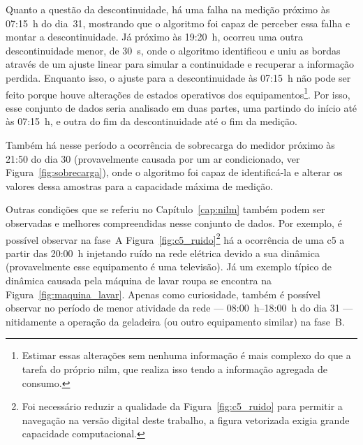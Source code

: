 Quanto a questão da descontinuidade, há uma falha na medição próximo
às 07:15~h do dia~31, mostrando que o algoritmo foi capaz de perceber
essa falha e montar a descontinuidade. Já próximo às 19:20~h, ocorreu
uma outra descontinuidade menor, de 30~s, onde o algoritmo identificou
e uniu as bordas através de um ajuste linear para simular a
continuidade e recuperar a informação perdida. Enquanto isso, o ajuste para a
descontinuidade às 07:15~h não pode ser feito porque houve alterações
de estados operativos dos equipamentos\footnote{Estimar essas
alterações sem nenhuma informação é mais complexo do que a tarefa do
próprio \acs{nilm}, que realiza isso tendo a informação agregada de
consumo.}. Por isso, esse conjunto de dados seria analisado em duas
partes, uma partindo do início até às 07:15~h, e outra do fim da
descontinuidade até o fim da medição.

Também há nesse período a ocorrência de sobrecarga do medidor próximo
às 21:50 do dia 30 (provavelmente causada por um ar condicionado, ver
Figura~\ref{fig:sobrecarga}), onde o algoritmo foi capaz de
identificá-la e alterar os valores dessa amostras para a capacidade
máxima de medição.

Outras condições que se referiu no Capítulo~\ref{cap:nilm} também
podem ser observadas e melhores compreendidas nesse conjunto de dados.
Por exemplo, é possível observar na fase~A
Figura~\ref{fig:c5_ruido}\footnote{Foi necessário reduzir a qualidade
da Figura~\ref{fig:c5_ruido} para permitir a navegação na versão
digital deste trabalho, a figura vetorizada exigia grande capacidade
computacional.}
há a ocorrência de uma \gls{c5} a partir das
20:00~h injetando ruído na rede elétrica devido a sua dinâmica
(provavelmente esse equipamento é uma televisão). Já um exemplo típico de dinâmica causada
pela máquina de lavar roupa se encontra na
Figura~\ref{fig:maquina_lavar}. Apenas como curiosidade, também é
possível observar no período de menor atividade da rede ---
08:00~h--18:00~h do dia 31 --- nitidamente a operação da geladeira (ou
outro equipamento similar) na fase~B.

